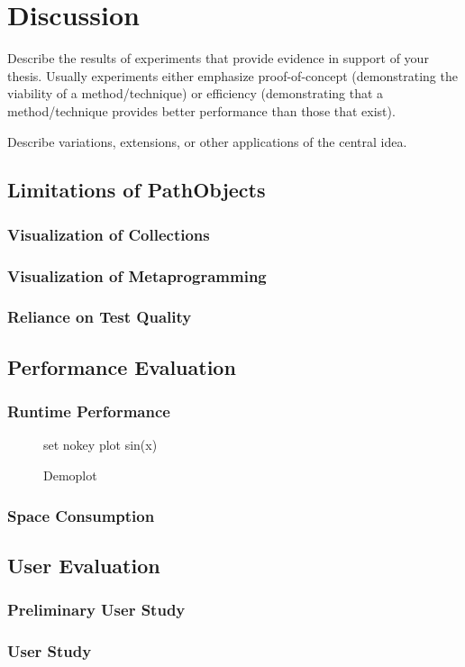 \chapter{Discussion}
\label{c:discussion}

Describe the results of experiments that provide evidence in support of your thesis. Usually experiments either emphasize proof-of-concept (demonstrating the viability of a method/technique) or efficiency (demonstrating that a method/technique provides better performance than those that exist).

Describe variations, extensions, or other applications of the central idea.

\section{Limitations of PathObjects}
\subsection{Visualization of Collections}
\subsection{Visualization of Metaprogramming}
\subsection{Reliance on Test Quality}

\section{Performance Evaluation}

\subsection{Runtime Performance}
\begin{figure}[height=3cm]
	\centering
	\begin{gnuplot}[terminal=pdf, terminaloptions={size 2in, 1in}]
		set nokey
		plot sin(x)
	\end{gnuplot}
	\caption{Demoplot}
\end{figure}

\subsection{Space Consumption}

\section{User Evaluation}
\subsection{Preliminary User Study}
\subsection{User Study}